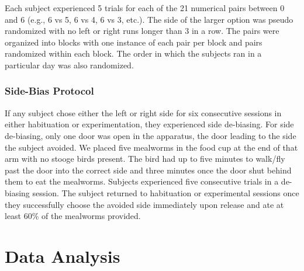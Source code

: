 \documentclass[
  english,
  ,doc,floatsintext]{apa6}
\begin{document}
Each subject experienced 5 trials for each of the 21 numerical pairs between 0 and 6 (e.g., 6 vs 5, 6 vs 4, 6 vs 3, etc.). The side of the larger option was pseudo randomized with no left or right runs longer than 3 in a row. The pairs were organized into blocks with one instance of each pair per block and pairs randomized within each block. The order in which the subjects ran in a particular day was also randomized.

\hypertarget{side-bias-protocol-1}{%
\subsubsection{Side-Bias Protocol}\label{side-bias-protocol-1}}

If any subject chose either the left or right side for six consecutive sessions in either habituation or experimentation, they experienced side de-biasing. For side de-biasing, only one door was open in the apparatus, the door leading to the side the subject avoided. We placed five mealworms in the food cup at the end of that arm with no stooge birds present. The bird had up to five minutes to walk/fly past the door into the correct side and three minutes once the door shut behind them to eat the mealworms. Subjects experienced five consecutive trials in a de-biasing session. The subject returned to habituation or experimental sessions once they successfully choose the avoided side immediately upon release and ate at least 60\% of the mealworms provided.

\hypertarget{data-analysis}{%
\section{Data Analysis}\label{data-analysis}}
\end{document}
